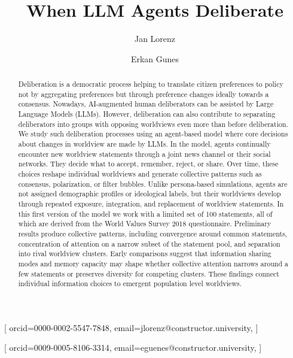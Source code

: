 \documentclass[]{ceurart}
\begin{document}


\title{When LLM Agents Deliberate}
\tnotemark[1]

\author[1]{Jan Lorenz}[%
orcid=0000-0002-5547-7848,%
email=jlorenz@constructor.university,%
]

\author[1]{Erkan Gunes}[%
orcid=0009-0005-8106-3314,%
email=eguenes@constructor.university,%
]


\address[1]{Constructor University, Bremen, Germany}

\begin{abstract}
Deliberation is a democratic process helping to translate citizen
preferences to policy not by aggregating preferences but through
preference changes ideally towards a consensus. Nowadays, AI-augmented
human deliberators can be assisted by Large Language Models (LLMs).
However, deliberation can also contribute to separating deliberators
into groups with opposing worldviews even more than before deliberation.
We study such deliberation processes using an agent-based model where
core decisions about changes in worldview are made by LLMs. In the
model, agents continually encounter new worldview statements through a
joint news channel or their social networks. They decide what to accept,
remember, reject, or share. Over time, these choices reshape individual
worldviews and generate collective patterns such as consensus,
polarization, or filter bubbles. Unlike persona-based simulations,
agents are not assigned demographic profiles or ideological labels, but
their worldviews develop through repeated exposure, integration, and
replacement of worldview statements. In this first version of the model
we work with a limited set of 100 statements, all of which are derived
from the World Values Survey 2018 questionnaire. Preliminary results
produce collective patterns, including convergence around common
statements, concentration of attention on a narrow subset of the
statement pool, and separation into rival worldview clusters. Early
comparisons suggest that information sharing modes and memory capacity
may shape whether collective attention narrows around a few statements
or preserves diversity for competing clusters. These findings connect
individual information choices to emergent population level worldviews.
\end{abstract}
\end{document}
